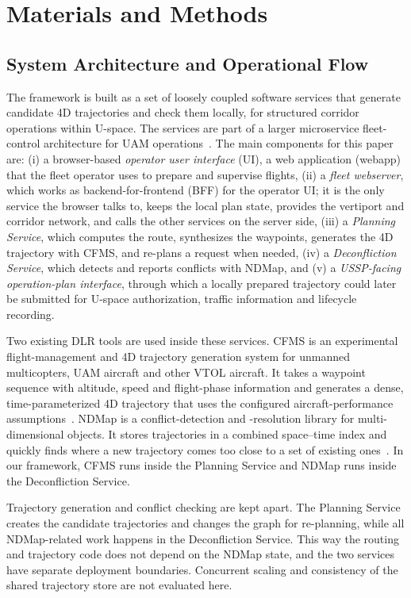 \section{Materials and Methods}
\label{sec:methodology}

\subsection{System Architecture and Operational Flow}
\label{sec:architecture}

The framework is built as a set of loosely coupled software services that generate candidate 4D trajectories and check them locally, for structured corridor operations within U-space. The services are part of a larger microservice fleet-control architecture for UAM operations~\cite{nagel2026microservice}. The main components for this paper are:
(i) a browser-based \emph{operator user interface} (UI), a web application (webapp) that the fleet operator uses to prepare and supervise flights,
(ii) a \emph{fleet webserver}, which works as backend-for-frontend (BFF) for the operator UI; it is the only service the browser talks to, keeps the local plan state, provides the vertiport and corridor network, and calls the other services on the server side,
(iii) a \emph{Planning Service}, which computes the route, synthesizes the waypoints, generates the 4D trajectory with CFMS, and re-plans a request when needed,
(iv) a \emph{Deconfliction Service}, which detects and reports conflicts with NDMap, and
(v) a \emph{USSP-facing operation-plan interface}, through which a locally prepared trajectory could later be submitted for U-space authorization, traffic information and lifecycle recording.

Two existing DLR tools are used inside these services. CFMS is an experimental flight-management and 4D trajectory generation system for unmanned multicopters, UAM aircraft and other VTOL aircraft. It takes a waypoint sequence with altitude, speed and flight-phase information and generates a dense, time-parameterized 4D trajectory that uses the configured aircraft-performance assumptions~\cite{morscheck2021cfms}. NDMap is a conflict-detection and -resolution library for multi-dimensional objects. It stores trajectories in a combined space--time index and quickly finds where a new trajectory comes too close to a set of existing ones~\cite{NDMap}. In our framework, CFMS runs inside the Planning Service and NDMap runs inside the Deconfliction Service.

Trajectory generation and conflict checking are kept apart. The Planning Service creates the candidate trajectories and changes the graph for re-planning, while all NDMap-related work happens in the Deconfliction Service. This way the routing and trajectory code does not depend on the NDMap state, and the two services have separate deployment boundaries. Concurrent scaling and consistency of the shared trajectory store are not evaluated here.

